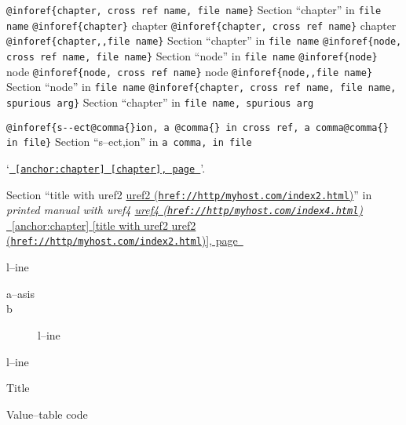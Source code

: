 \documentclass{book}
\begin{document}
\texttt{@inforef\{chapter, cross ref name, file name\}} Section ``chapter'' in \texttt{file name}
\texttt{@inforef\{chapter\}} chapter
\texttt{@inforef\{chapter, cross ref name\}} chapter
\texttt{@inforef\{chapter,,file name\}} Section ``chapter'' in \texttt{file name}
\texttt{@inforef\{node, cross ref name, file name\}} Section ``node'' in \texttt{file name}
\texttt{@inforef\{node\}} node
\texttt{@inforef\{node, cross ref name\}} node
\texttt{@inforef\{node,,file name\}} Section ``node'' in \texttt{file name}
\texttt{@inforef\{chapter, cross ref name, file name, spurious arg\}} Section ``chapter'' in \texttt{file name, spurious arg}

\texttt{@inforef\{s{-}{-}ect@comma\{\}ion, a @comma\{\} in cross
ref, a comma@comma\{\} in file\}}
Section ``s--ect,ion'' in \texttt{a comma, in file}

`\texttt{\hyperref[anchor:chapter]{\chaptername~\ref*{anchor:chapter} [chapter], page~\pageref*{anchor:chapter}}}'.

Section ``title with uref2 \href{href://http/myhost.com/index2.html}{uref2 (\nolinkurl{href://http/myhost.com/index2.html})}'' in \textit{printed manual with uref4 \href{href://http/myhost.com/index4.html}{uref4 (\nolinkurl{href://http/myhost.com/index4.html})}}
\hyperref[anchor:chapter]{\chaptername~\ref*{anchor:chapter} [title with uref2 \href{href://http/myhost.com/index2.html}{uref2 (\nolinkurl{href://http/myhost.com/index2.html})}], page~\pageref*{anchor:chapter}}

\begin{description}[format=\textbf]
\item[a--strong]
l--ine
\end{description}

\begin{description}
\item[a--asis]
%
\item[b]
%
l--ine
\end{description}

\begin{description}[format=\normalfont\emph]
\item[a]
%
%
\item[b]
%
l--ine
\end{description}

\begin{description}[format=\texttt]
\item[] Title
\item[a{-}{-}code]
Value--table code
\end{description}
\end{document}
